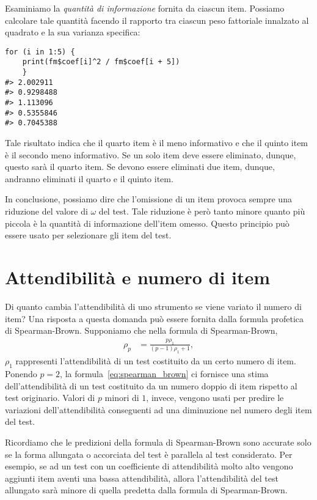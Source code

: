 \begin{exmp}
\begin{lstlisting}
\end{lstlisting}
Esaminiamo  la \emph{quantità di informazione} fornita da ciascun
item. Possiamo calcolare tale quantità facendo il
rapporto tra ciascun peso fattoriale innalzato al quadrato e la sua
varianza specifica: 
\begin{lstlisting}
for (i in 1:5) {
    print(fm$coef[i]^2 / fm$coef[i + 5])
    }
#> 2.002911 
#> 0.9298488 
#> 1.113096 
#> 0.5355846 
#> 0.7045388 
\end{lstlisting}
Tale risultato indica che il quarto item è il meno informativo e che il  quinto item è il secondo meno informativo. Se un solo item deve essere eliminato, dunque, questo sarà il quarto item. Se devono essere eliminati due item, dunque, andranno eliminati il quarto e il quinto item. 
\end{exmp}

In conclusione, possiamo dire che l'omissione di un item provoca sempre una riduzione del valore di $\omega$ del test. Tale riduzione è però tanto minore quanto più piccola è la quantità di informazione dell'item omesso. Questo principio può essere usato per selezionare gli item del test. 

\section{Attendibilità e numero di item}
\label{sec:reliability_number_item}

Di quanto cambia l'attendibilità di uno strumento se viene variato il numero di item? Una risposta a questa domanda può essere fornita dalla formula profetica di Spearman-Brown. Supponiamo che nella formula di Spearman-Brown,
\begin{align}
  \rho_p &= \frac{p \rho_1}{(p-1)\rho_1 + 1},
  \label{eq:spearman_brown}
\end{align}
$\rho_1$ rappresenti l'attendibilità di un test costituito da un certo numero di item. Ponendo $p=2$, la formula~\ref{eq:spearman_brown} ci fornisce una stima dell'attendibilità di un test costituito da un numero doppio di item rispetto al test originario. Valori di $p$ minori di $1$, invece, vengono usati per predire le variazioni dell'attendibilità conseguenti ad una diminuzione nel numero degli item del test.

Ricordiamo che le predizioni della formula di Spearman-Brown sono accurate solo se la forma allungata o accorciata del test è parallela al test considerato. Per esempio, se ad un test con un coefficiente di attendibilità molto alto vengono aggiunti item aventi una bassa attendibilità, allora l'attendibilità del test allungato sarà minore di quella predetta dalla formula di Spearman-Brown.

